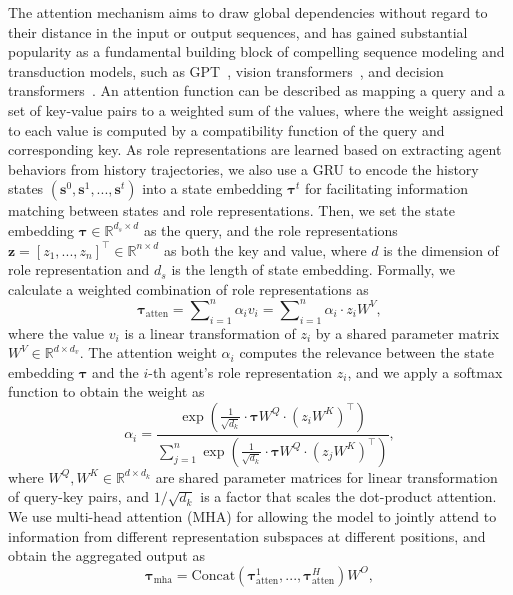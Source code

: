 \documentclass{article} %
\begin{document}
The attention mechanism aims to draw global dependencies without regard to their distance in the input or output sequences, and has gained substantial popularity as a fundamental building block of compelling sequence modeling and transduction models, such as GPT~\citep{brown2020language}, vision transformers~\citep{dosovitskiy2021image}, and decision transformers~\citep{chen2021decision}.
An attention function can be described as mapping a query and a set of key-value pairs to a weighted sum of the values, where the weight assigned to each value is computed by a compatibility function of the query and corresponding key.
As role representations are learned based on extracting agent behaviors from history trajectories, we also use a GRU to encode the history states $(\bm{s}^0, \bm{s}^1,..., \bm{s}^t)$ into a state embedding $\bm{\tau}^t$ for facilitating information matching between states and role representations.
Then, we set the state embedding $\bm{\tau} \in \mathbb{R}^{d_s\times d}$ as the query, and the role representations $\bm{z}=[z_1,...,z_n]^\top \in \mathbb{R}^{n\times d}$ as both the key and value, where $d$ is the dimension of role representation and $d_s$ is the length of state embedding. 
Formally, we calculate a weighted combination of role representations as
\begin{equation}\label{att_i}
    \bm{\tau}_{\text{atten}}=\sum\nolimits_{i=1}^n \alpha_i v_i=\sum\nolimits_{i=1}^n \alpha_i \cdot z_i W^V,
\end{equation}
where the value $v_i$ is a linear transformation of $z_i$ by a shared parameter matrix $W^V\in \mathbb{R}^{d\times d_v}$.
The attention weight $\alpha_i$ computes the relevance between the state embedding $\bm{\tau}$ and the $i$-th agent's role representation $z_i$, and we apply a softmax function to obtain the weight as
\begin{equation}\label{af}
    \alpha_i=\frac{\exp\left(\frac{1}{\sqrt{d_k}} \cdot \bm{\tau} W^Q \cdot \left(z_i W^K\right)^\top\right)}{\sum_{j=1}^{n}\exp\left(\frac{1}{\sqrt{d_k}} \cdot \bm{\tau} W^Q \cdot \left(z_j W^K\right)^\top\right)},
\end{equation}
where $W^Q, W^K \!\in\! \mathbb{R}^{d\times d_k}$ are shared parameter matrices for linear transformation of query-key pairs, and $1/\sqrt{d_k}$ is a factor that scales the dot-product attention. 
We use multi-head attention (MHA) for allowing the model to jointly attend to information from different representation subspaces at different positions, and obtain the aggregated output as
\begin{equation}\label{att_all}
\bm{\tau}_{\text{mha}}=\text{Concat}\left(\bm{\tau}_{\text{atten}}^1,...,\bm{\tau}_{\text{atten}}^H \right)W^O,
\end{equation}
\end{document}
